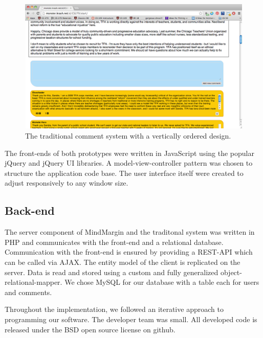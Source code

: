 \begin{figure}
\centering
\includegraphics[scale=0.18]{traditional.png} 
\caption{The traditional comment system with a vertically ordered design.}
\label{fig:traditional}
\end{figure}

The front-ends of both prototypes were written in JavaScript using the popular jQuery and jQuery UI libraries. A model-view-controller pattern was chosen to structure the application code base. The user interface itself were created to adjust responsively to any window size.

\subsection{Back-end}
The server component of MindMargin and the traditonal system was written in PHP and communicates with the front-end and a relational database. Communication with the front-end is ensured by providing a REST-API which can be called via AJAX. The entity model of the client is replicated on the server. Data is read and stored using a custom and fully generalized object-relational-mapper. We chose MySQL for our database with a table each for users and comments.

Throughout the implementation, we followed an iterative approach to programming our software. The developer team was small. All developed code is released under the BSD open source license on github.